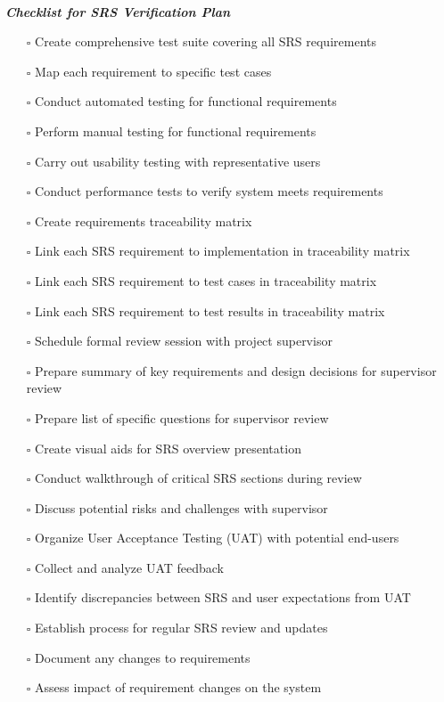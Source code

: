 \documentclass[12pt, titlepage]{article}
\begin{document}
\textbf{\textit{\\Checklist for SRS Verification Plan}}
\begin{itemize}
    \item[$\square$] Create comprehensive test suite covering all SRS requirements
    \item[$\square$] Map each requirement to specific test cases
    \item[$\square$] Conduct automated testing for functional requirements
    \item[$\square$] Perform manual testing for functional requirements
    \item[$\square$] Carry out usability testing with representative users
    \item[$\square$] Conduct performance tests to verify system meets requirements
    \item[$\square$] Create requirements traceability matrix
    \item[$\square$] Link each SRS requirement to implementation in traceability matrix
    \item[$\square$] Link each SRS requirement to test cases in traceability matrix
    \item[$\square$] Link each SRS requirement to test results in traceability matrix
    \item[$\square$] Schedule formal review session with project supervisor
    \item[$\square$] Prepare summary of key requirements and design decisions for supervisor review
    \item[$\square$] Prepare list of specific questions for supervisor review
    \item[$\square$] Create visual aids for SRS overview presentation
    \item[$\square$] Conduct walkthrough of critical SRS sections during review
    \item[$\square$] Discuss potential risks and challenges with supervisor
    \item[$\square$] Organize User Acceptance Testing (UAT) with potential end-users
    \item[$\square$] Collect and analyze UAT feedback
    \item[$\square$] Identify discrepancies between SRS and user expectations from UAT
    \item[$\square$] Establish process for regular SRS review and updates
    \item[$\square$] Document any changes to requirements
    \item[$\square$] Assess impact of requirement changes on the system
\end{itemize}
\end{document}
